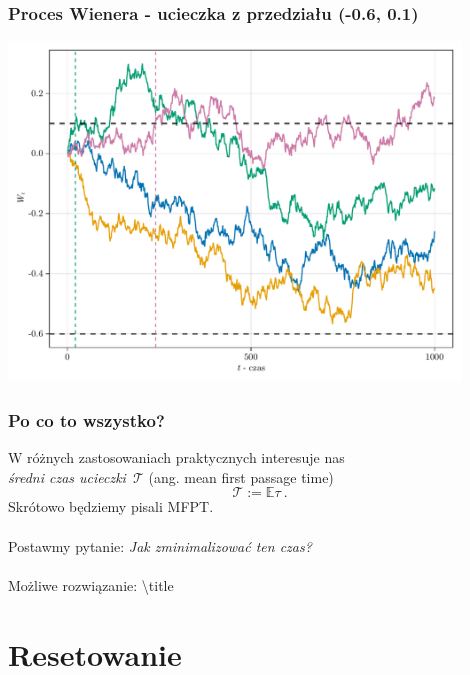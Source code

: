 \documentclass{beamer}
\newcommand{\E}{\mathbb{E}}
\newcommand{\1}{\mathbb{1}}
\newcommand{\T}{\mathcal{T}}
\begin{document}
\begin{frame}
\frametitle{Proces Wienera - ucieczka z przedziału (-0.6, 0.1)}
\includegraphics[width=0.9\textwidth]{wiener-sim/tr-with-bounds.pdf}
\end{frame}


\begin{frame}
\frametitle{Po co to wszystko?}
\pause
W różnych zastosowaniach praktycznych interesuje nas \\ \emph{średni czas ucieczki}~$\T$ (ang. mean first passage time) 
\begin{equation}
\T := \E \tau~.
\end{equation}
Skrótowo będziemy pisali MFPT. \\~\\

\pause
Postawmy pytanie: \emph{Jak zminimalizować ten czas?} \\~\\
\pause
Możliwe rozwiązanie: \textbackslash title

\end{frame}





\section{Resetowanie}
\end{document}

